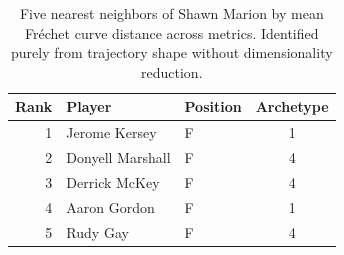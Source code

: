 \begin{table}[htbp]
  \centering\small
  \begin{tabular}{rllc}
    \toprule
    Rank & Player & Position & Archetype \\
    \midrule
    1 & Jerome Kersey & F & 1 \\
    2 & Donyell Marshall & F & 4 \\
    3 & Derrick McKey & F & 4 \\
    4 & Aaron Gordon & F & 1 \\
    5 & Rudy Gay & F & 4 \\
    \bottomrule
  \end{tabular}
  \caption{Five nearest neighbors of Shawn Marion by mean Fr\'{e}chet curve distance across metrics. Identified purely from trajectory shape without dimensionality reduction.}
  \label{tab:Shawn_Marion_frechet_curve_neighbors}
\end{table}

